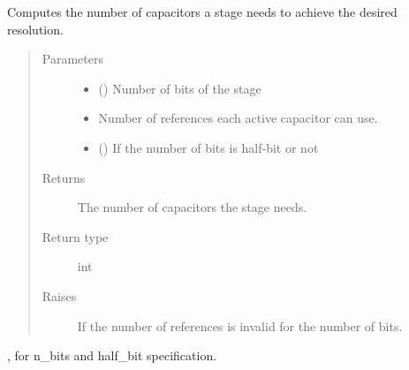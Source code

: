 \documentclass[letterpaper,10pt,english]{sphinxmanual}
\begin{document}

\begin{fulllineitems}
\label{\detokenize{gen:calib.gen.compute_n_caps}}
Computes the number of capacitors a stage needs to achieve the desired
resolution.
\begin{quote}\begin{description}
\item[{Parameters}] \leavevmode\begin{itemize}
\item {} 
 (\sphinxstyleliteralemphasis{\sphinxupquote{, }}\sphinxstyleliteralemphasis{\sphinxupquote{, }}) \textendash{} Number of bits of the stage

\item {} 
 \textendash{} Number of references each active capacitor can use.

\item {} 
 () \textendash{} If the number of bits is half-bit or not

\end{itemize}

\item[{Returns}] \leavevmode
The number of capacitors the stage needs.

\item[{Return type}] \leavevmode
int

\item[{Raises}] \leavevmode
{} \textendash{} If the number of references is invalid for the
number of bits.

\end{description}\end{quote}




{\hyperref[\detokenize{gen:calib.gen.parse_bits}]{}}, for n\_bits and half\_bit specification.



\end{fulllineitems}
\end{document}
